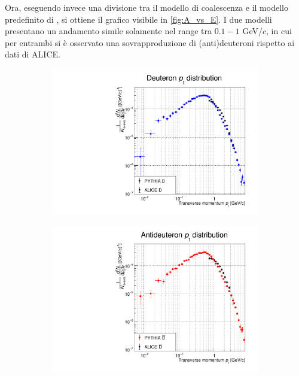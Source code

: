 Ora, eseguendo invece una divisione tra il modello di coalescenza e il modello predefinito di \pythiaa{}, si ottiene il grafico visibile in \autoref{fig:A_vs_E}.
I due modelli presentano un andamento simile solamente nel range tra $0.1-1$ GeV/$c$, in cui per entrambi si è osservato una sovrapproduzione di (anti)deuteroni rispetto ai dati di ALICE.
\begin{figure}[htbp]
    \centering
    \begin{subfigure}{.49\textwidth}
    \centering
        \includegraphics[width=\textwidth]{image/3-risultati/analyse/E/deuteron.pdf}
        \caption{}
        \label{fig:E_deuteron}
    \end{subfigure}
    \begin{subfigure}{.49\textwidth}
        \centering
        \includegraphics[width=\textwidth]{image/3-risultati/analyse/E/antideuteron.pdf}
        \caption{}
        \label{fig:E_antideuteron}
    \end{subfigure}
    \label{fig:E_(anti)deuteron}
\end{figure}

